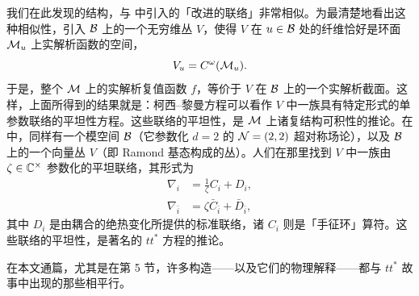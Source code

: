 我们在此发现的结构，与 \cite{Cecotti:1991me} 中引入的「改进的联络」非常相似。为最清楚地看出这种相似性，引入 $\mathcal{B}$ 上的一个无穷维丛 $V$，使得 $V$ 在 $u \in \mathcal{B}$ 处的纤维恰好是环面 $\mathcal{M}_u$ 上实解析函数的空间，
\begin{equation}
V_u = C^\omega(\mathcal{M}_u).
\end{equation}
于是，整个 $\mathcal{M}$ 上的实解析复值函数 $f$，等价于 $V$ 在 $\mathcal{B}$ 上的一个实解析截面。这样，上面所得到的结果就是：柯西--黎曼方程可以看作 $V$ 中一族具有特定形式的单参数联络的平坦性方程。这些联络的平坦性，是 $\mathcal{M}$ 上诸复结构可积性的推论。在 \cite{Cecotti:1991me} 中，同样有一个模空间 $\mathcal{B}$（它参数化 $d=2$ 的 $\mathcal{N}=(2,2)$ 超对称场论），以及 $\mathcal{B}$ 上的一个向量丛 $V$（即 Ramond 基态构成的丛）。人们在那里找到 $V$ 中一族由 $\zeta \in \mathbb{C}^\times$ 参数化的平坦联络，其形式为
\begin{align}
\nabla_i &= \frac{1}{\zeta} C_i + D_i, \\
\nabla_{\bar i} &= \zeta \bar{C}_{\bar i} + \bar{D}_{\bar i},
\end{align}
其中 $D_i$ 是由耦合的绝热变化所提供的标准联络，诸 $C_i$ 则是「手征环」算符。这些联络的平坦性，是著名的 $tt^*$ 方程的推论。

在本文通篇，尤其是在第 5 节，许多构造——以及它们的物理解释——都与 $tt^*$ 故事中出现的那些相平行。%

